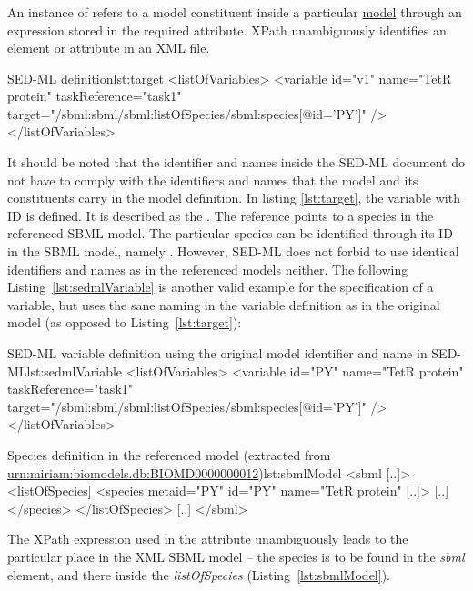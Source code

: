 \subsubsection{}
\label{sec:target}
An instance of  refers to a model constituent inside a particular \hyperref[class:model]{model} through an  expression stored in the required  attribute. 
%
XPath  unambiguously identifies an element or attribute in an XML file.

%
\begin{myXmlLst}{SED-ML  definition}{lst:target}
   <listOfVariables>
    <variable id="v1" name="TetR protein" taskReference="task1" 
     target="/sbml:sbml/sbml:listOfSpecies/sbml:species[@id='PY']" />
   </listOfVariables>
\end{myXmlLst}
%
It should be noted that the identifier and names inside the SED-ML document do not have to comply with the identifiers and names that the model and its constituents carry in the model definition. In  listing \vref{lst:target}, the variable with ID  is defined. It is described as the . The reference points to a species in the referenced SBML model. The particular species can be identified through its ID in the SBML model, namely . However, SED-ML does not forbid to use identical identifiers and names as in the referenced models neither. The following Listing~\vref{lst:sedmlVariable} is another valid example for the specification of a variable, but uses the sane naming in the variable definition as in the original model (as opposed to Listing~\ref{lst:target}):
%
\begin{myXmlLst}{SED-ML variable definition using the original model identifier and name in SED-ML}{lst:sedmlVariable}
   <listOfVariables>
    <variable id="PY" name="TetR protein"  taskReference="task1" 
     target="/sbml:sbml/sbml:listOfSpecies/sbml:species[@id='PY']" />
   </listOfVariables>
\end{myXmlLst}
%

%
\begin{myXmlLst}{Species definition in the referenced model (extracted from \url{urn:miriam:biomodels.db:BIOMD0000000012})}{lst:sbmlModel}
<sbml [..]>
 <listOfSpecies]
  <species metaid="PY" id="PY" name="TetR protein" [..]>
   [..]
  </species>
 </listOfSpecies>
 [..]
</sbml>
\end{myXmlLst}
%

The XPath expression used in the  attribute unambiguously leads to the particular place in the XML SBML model -- the species is to be found in the \emph{sbml} element, and there inside the \emph{listOfSpecies} (Listing~\vref{lst:sbmlModel}). 
